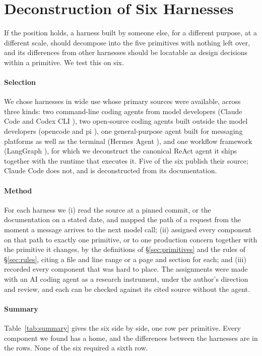 \section{Deconstruction of Six Harnesses}
\label{sec:deconstruction}
If the position holds, a harness built by someone else, for a different purpose, at a different scale, should decompose into the five primitives with nothing left over, and its differences from other harnesses should be locatable as design decisions within a primitive. We test this on six.

\paragraph{Selection} We chose harnesses in wide use whose primary sources were available, across three kinds: two command-line coding agents from model developers (Claude Code \cite{claudecode} and Codex CLI \cite{codexcli}), two open-source coding agents built outside the model developers (opencode \cite{opencode} and pi \cite{pi}), one general-purpose agent built for messaging platforms as well as the terminal (Hermes Agent \cite{hermes}), and one workflow framework (LangGraph \cite{langgraph}), for which we deconstruct the canonical ReAct agent it ships together with the runtime that executes it. Five of the six publish their source; Claude Code does not, and is deconstructed from its documentation.

\paragraph{Method} For each harness we (i) read the source at a pinned commit, or the documentation on a stated date, and mapped the path of a request from the moment a message arrives to the next model call; (ii) assigned every component on that path to exactly one primitive, or to one production concern together with the primitive it changes, by the definitions of \S\ref{sec:primitives} and the rules of \S\ref{sec:rules}, citing a file and line range or a page and section for each; and (iii) recorded every component that was hard to place. The assignments were made with an AI coding agent as a research instrument, under the author's direction and review, and each can be checked against its cited source without the agent.

\paragraph{Summary} Table~\ref{tab:summary} gives the six side by side, one row per primitive. Every component we found has a home, and the differences between the harnesses are in the rows. None of the six required a sixth row.


